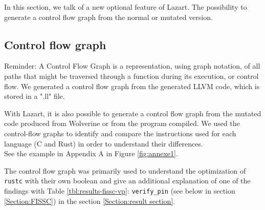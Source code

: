 \label{Section:CFG}
In this section, we talk of a new optional feature of Lazart.
The possibility to generate a control flow graph from the normal or mutated version.
\subsection{Control flow graph}
Reminder: A Control Flow Graph is a representation, using graph notation, of all paths that might be traversed through a function during its execution, or control flow.
We generated a control flow graph from the generated LLVM code, which is stored in a ".ll" file.

With Lazart, it is also possible to generate a control flow graph from the mutated code produced from Wolverine or from the program compiled.
We used the control-flow graphs to identify and compare the instructions used for each language (C and Rust) in order to understand their differences.\\

See the example in Appendix A in Figure \ref{fig:annexe1}.

The control flow graph was primarily used to understand the optimization of \texttt{rustc} with their own boolean and give an additional explanation of one of the findings with Table \ref{tbl:results-fissc-vp}: \texttt{verify\_pin} (see below in section \ref{Section:FISSC}) in the section \ref{Section:result section}.
